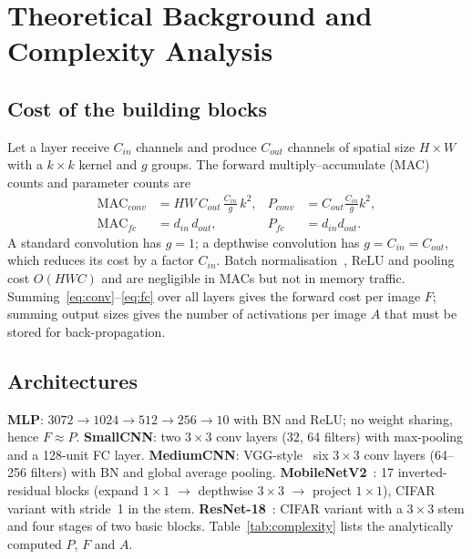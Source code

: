 \documentclass[conference]{IEEEtran}
\begin{document}
\section{Theoretical Background and Complexity Analysis}
\subsection{Cost of the building blocks}
Let a layer receive $C_{in}$ channels and produce $C_{out}$ channels of spatial size $H\times W$ with a $k\times k$
kernel and $g$ groups. The forward multiply--accumulate (MAC) counts and parameter counts are
\begin{align}
\text{MAC}_{conv} &= H W\, C_{out}\, \tfrac{C_{in}}{g}\, k^2, & P_{conv} &= C_{out}\tfrac{C_{in}}{g}k^2, \label{eq:conv}\\
\text{MAC}_{fc} &= d_{in}\, d_{out}, & P_{fc} &= d_{in} d_{out}. \label{eq:fc}
\end{align}
A standard convolution has $g=1$; a depthwise convolution has $g=C_{in}=C_{out}$, which reduces its cost by a factor
$C_{in}$. Batch normalisation~\cite{ioffe2015bn}, ReLU and pooling cost $O(HWC)$ and are negligible in MACs but
not in memory traffic. Summing~\eqref{eq:conv}--\eqref{eq:fc} over all layers gives the forward cost per image $F$;
summing output sizes gives the number of activations per image $A$ that must be stored for back-propagation.

\subsection{Architectures}
\textbf{MLP}: $3072\!\to\!1024\!\to\!512\!\to\!256\!\to\!10$ with BN and ReLU; no weight sharing, hence
$F\approx P$. \textbf{SmallCNN}: two $3\times3$ conv layers (32, 64 filters) with max-pooling and a 128-unit FC layer.
\textbf{MediumCNN}: VGG-style~\cite{simonyan2015vgg} six $3\times3$ conv layers (64--256 filters) with BN and global
average pooling. \textbf{MobileNetV2}~\cite{sandler2018mobilenetv2}: 17 inverted-residual blocks
(expand $1\times1$ $\to$ depthwise $3\times3$ $\to$ project $1\times1$), CIFAR variant with stride~1 in the stem.
\textbf{ResNet-18}~\cite{he2016resnet}: CIFAR variant with a $3\times3$ stem and four stages of two basic blocks.
Table~\ref{tab:complexity} lists the analytically computed $P$, $F$ and $A$.

\begin{table}[t]
\centering
\caption{Analytical complexity per $32\times32$ image (computed with forward hooks)}
\label{tab:complexity}

\end{table}
\end{document}
